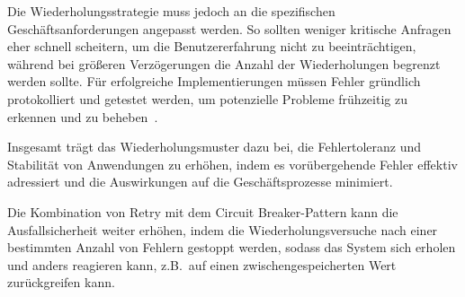 Die Wiederholungsstrategie muss jedoch an die spezifischen Geschäftsanforderungen angepasst werden.
So sollten weniger kritische Anfragen eher schnell scheitern, um die Benutzererfahrung nicht zu beeinträchtigen,
während bei größeren Verzögerungen die Anzahl der Wiederholungen begrenzt werden sollte.
Für erfolgreiche Implementierungen müssen Fehler gründlich protokolliert und getestet werden,
um potenzielle Probleme frühzeitig zu erkennen und zu beheben~\cite{Meheden.2021}.

Insgesamt trägt das Wiederholungsmuster dazu bei, die Fehlertoleranz und Stabilität von Anwendungen zu erhöhen,
indem es vorübergehende Fehler effektiv adressiert und die Auswirkungen auf die Geschäftsprozesse minimiert.

Die Kombination von Retry mit dem Circuit Breaker-Pattern kann die Ausfallsicherheit weiter erhöhen,
indem die Wiederholungsversuche nach einer bestimmten Anzahl von Fehlern gestoppt werden,
sodass das System sich erholen und anders reagieren kann, z.B.\ auf einen zwischengespeicherten Wert zurückgreifen kann.


